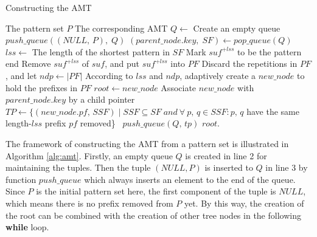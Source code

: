 \documentclass{article}
\begin{document}
\begin{algorithm}
  \caption{Constructing the AMT}\scriptsize
  \label{alg:amt}
  \begin{algorithmic}[1]
    \REQUIRE The pattern set $P$
    \ENSURE The corresponding AMT
    \STATE
    \STATE $Q \leftarrow$ Create an empty queue
    \STATE $push\_queue((NULL,\,P),\; Q)$
    \STATE
    \STATE $(parent\_node.key,\; SF) \leftarrow pop\_queue(Q)$
    \STATE $lss \leftarrow$ The length of the shortest pattern in $SF$
    \STATE Mark $suf^{+lss}$ to be the pattern end
    \ENDIF
    \STATE Remove $suf^{+lss}$ of $suf$, and put $suf^{+lss}$ into $PF$
    \ENDFOR
    \STATE Discard the repetitions in $PF$, and let $ndp \leftarrow |PF|$
    \STATE According to $lss$ and $ndp$, adaptively create a
    $new\_node$ to hold the prefixes in
    $PF$
    \STATE $root \leftarrow new\_node$
    \ELSE
    \STATE Associate $new\_node$
    with $parent\_node.key$ by a child pointer
    \ENDIF
    \STATE $TP \leftarrow \{(new\_node.pf,\, SSF) \mid SSF \subseteq SF\; and
    \ \forall \ p,\,q \in SSF: p,\,q$ have the same length-$lss$ prefix
    $pf$ removed\}\
    \STATE $push\_queue(Q,\,tp)$
    \ENDFOR
    \ENDWHILE
    \STATE
    \RETURN $root$.
  \end{algorithmic}
\end{algorithm}

The framework of constructing the AMT from a pattern set is
illustrated in Algorithm \ref{alg:amt}. Firstly, an empty queue $Q$ is
created in line 2 for maintaining the tuples. Then the tuple
$(NULL, P)$ is inserted to $Q$ in line 3 by function $push\_queue$
which always inserts an element to the end of the queue. Since $P$ is
the initial pattern set here, the first component of the tuple is
$NULL$, which means there is no prefix removed from $P$ yet. By this
way, the creation of the root can be combined with the creation of
other tree nodes in the following \textbf{while} loop.
\end{document}

